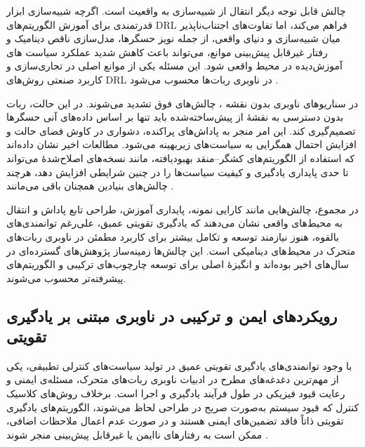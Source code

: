 چالش قابل توجه دیگر انتقال از شبیه‌سازی به واقعیت است. اگرچه شبیه‌سازی ابزار قدرتمندی برای آموزش الگوریتم‌های DRL فراهم می‌کند، اما تفاوت‌های اجتناب‌ناپذیر میان شبیه‌سازی و دنیای واقعی، از جمله نویز حسگرها، مدل‌سازی ناقص دینامیک و رفتار غیرقابل پیش‌بینی موانع، می‌تواند باعث کاهش شدید عملکرد سیاست‌ های آموزش‌دیده در محیط واقعی شود. این مسئله یکی از موانع اصلی در تجاری‌سازی و کاربرد صنعتی روش‌های DRL در ناوبری ربات‌ها محسوب می‌شود %
\cite{Le2024DRLNavigationSurvey}.

در سناریوهای ناوبری بدون نقشه%
، چالش‌های فوق تشدید می‌شوند. در این حالت، ربات بدون دسترسی به نقشهٔ از پیش‌ساخته‌شده باید تنها بر اساس داده‌های آنی حسگرها تصمیم‌گیری کند. این امر منجر به پاداش‌های پراکنده، دشواری در کاوش فضای حالت و افزایش احتمال همگرایی به سیاست‌های زیر‌بهینه می‌شود. مطالعات اخیر نشان داده‌اند که استفاده از الگوریتم‌های کشگر--منقد بهبود‌یافته، مانند نسخه‌های اصلاح‌شدهٔ  می‌تواند تا حدی پایداری یادگیری و کیفیت سیاست‌ها را در چنین شرایطی افزایش دهد، هرچند چالش‌های بنیادین همچنان باقی می‌مانند %
\cite{Nasti2025MaplessTD3}.

در مجموع، چالش‌هایی مانند کارایی نمونه، پایداری آموزش، طراحی تابع پاداش و انتقال به محیط‌های واقعی نشان می‌دهند که یادگیری تقویتی عمیق، علی‌رغم توانمندی‌های بالقوه، هنوز نیازمند توسعه و تکامل بیشتر برای کاربرد مطمئن در ناوبری ربات‌های متحرک در محیط‌های دینامیکی است. این چالش‌ها زمینه‌ساز پژوهش‌های گسترده‌ای در سال‌های اخیر بوده‌اند و انگیزهٔ اصلی برای توسعه چارچوب‌های ترکیبی و الگوریتم‌های پیشرفته‌تر محسوب می‌شوند.
\subsection{رویکردهای ایمن و ترکیبی در ناوبری مبتنی بر یادگیری تقویتی}

با وجود توانمندی‌های یادگیری تقویتی عمیق در تولید سیاست‌های کنترلی تطبیقی، یکی از مهم‌ترین دغدغه‌های مطرح در ادبیات ناوبری ربات‌های متحرک، مسئله‌ی ایمنی و رعایت قیود فیزیکی در طول فرآیند یادگیری و اجرا است. برخلاف روش‌های کلاسیک کنترل که قیود سیستم به‌صورت صریح در طراحی لحاظ می‌شوند، الگوریتم‌های یادگیری تقویتی ذاتاً فاقد تضمین‌های ایمنی هستند و در صورت عدم اعمال ملاحظات اضافی، ممکن است به رفتارهای ناایمن یا غیرقابل پیش‌بینی منجر شوند %
\cite{Le2024DRLNavigationSurvey}.

